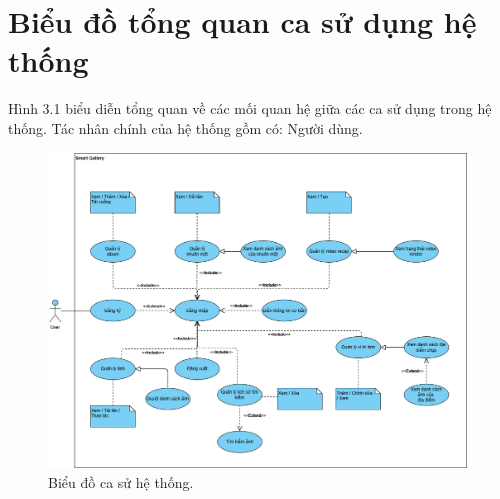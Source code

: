 \section{Biểu đồ tổng quan ca sử dụng hệ thống}
Hình 3.1 biểu diễn tổng quan về các mối quan hệ giữa các ca sử dụng trong hệ
thống. Tác nhân chính của hệ thống gồm có: Người dùng.
\begin{figure}[H]
    \centering
    \includegraphics[width=1\textwidth]{figures/c3/3-2-usecase-graph_3.png}
    \caption{Biểu đồ ca sử hệ thống.}
    \label{fig:3-2-usecase-graph}
\end{figure}